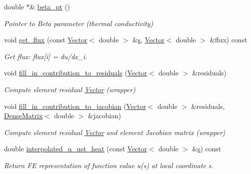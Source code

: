 \begin{DoxyCompactItemize}
double $\ast$\& \hyperlink{classoomph_1_1UnsteadyHeatEquations_a73b52f5aa092ab1d836843d30273d9a8}{beta\+\_\+pt} ()
\begin{DoxyCompactList}\small\item\em Pointer to Beta parameter (thermal conductivity) \end{DoxyCompactList}\item 
void \hyperlink{classoomph_1_1UnsteadyHeatEquations_a16a237c1055f7d8f577eab77ca00a03c}{get\+\_\+flux} (const \hyperlink{classoomph_1_1Vector}{Vector}$<$ double $>$ \&\hyperlink{cfortran_8h_ab7123126e4885ef647dd9c6e3807a21c}{s}, \hyperlink{classoomph_1_1Vector}{Vector}$<$ double $>$ \&flux) const
\begin{DoxyCompactList}\small\item\em Get flux\+: flux\mbox{[}i\mbox{]} = du/dx\+\_\+i. \end{DoxyCompactList}\item 
void \hyperlink{classoomph_1_1UnsteadyHeatEquations_a46541bba4b3116b8db9d15a4f213b0e6}{fill\+\_\+in\+\_\+contribution\+\_\+to\+\_\+residuals} (\hyperlink{classoomph_1_1Vector}{Vector}$<$ double $>$ \&residuals)
\begin{DoxyCompactList}\small\item\em Compute element residual \hyperlink{classoomph_1_1Vector}{Vector} (wrapper) \end{DoxyCompactList}\item 
void \hyperlink{classoomph_1_1UnsteadyHeatEquations_a17f787d9bb9e6de030b28d2d12f41fd4}{fill\+\_\+in\+\_\+contribution\+\_\+to\+\_\+jacobian} (\hyperlink{classoomph_1_1Vector}{Vector}$<$ double $>$ \&residuals, \hyperlink{classoomph_1_1DenseMatrix}{Dense\+Matrix}$<$ double $>$ \&jacobian)
\begin{DoxyCompactList}\small\item\em Compute element residual \hyperlink{classoomph_1_1Vector}{Vector} and element Jacobian matrix (wrapper) \end{DoxyCompactList}\item 
double \hyperlink{classoomph_1_1UnsteadyHeatEquations_a6e9c1454f84d2b55e5c573df195b4946}{interpolated\+\_\+u\+\_\+ust\+\_\+heat} (const \hyperlink{classoomph_1_1Vector}{Vector}$<$ double $>$ \&\hyperlink{cfortran_8h_ab7123126e4885ef647dd9c6e3807a21c}{s}) const
\begin{DoxyCompactList}\small\item\em Return FE representation of function value u(s) at local coordinate s. \end{DoxyCompactList}\item 

\end{DoxyCompactItemize}
